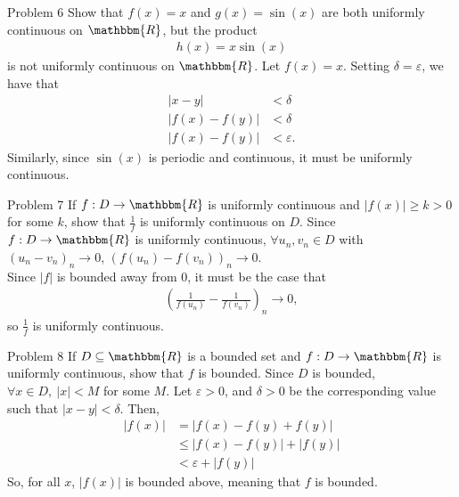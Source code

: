 \documentclass[10pt]{extarticle}
\newcommand{\R}{\mathbbm{R}}
\begin{document}
  \begin{problem}{Problem 6}
    Show that $f(x) = x$ and $g(x) = \sin(x)$ are both uniformly continuous on $\R$, but the product
    \begin{align*}
      h(x) = x\sin(x)
    \end{align*}
    is not uniformly continuous on $\R$.
    \tcblower
    Let $f(x) = x$. Setting $\delta = \varepsilon$, we have that
    \begin{align*}
      |x-y| &< \delta\\
      |f(x) - f(y)| &< \delta\\
      |f(x) - f(y)| &< \varepsilon.
    \end{align*}
    Similarly, since $\sin(x)$ is periodic and continuous, it must be uniformly continuous.
  \end{problem}
  \begin{problem}{Problem 7}
    If $f: D\rightarrow \R$ is uniformly continuous and $|f(x)| \geq k > 0$ for some $k$, show that $\frac{1}{f}$ is uniformly continuous on $D$.
    \tcblower
    Since $f: D\rightarrow\R$ is uniformly continuous, $\forall u_n,v_n\in D$ with $\left(u_n - v_n\right)_n\rightarrow 0$, $\left(f(u_n)-f(v_n)\right)_n \rightarrow 0$.\\

    Since $|f|$ is bounded away from $0$, it must be the case that
    \begin{align*}
      \left(\frac{1}{f(u_n)} - \frac{1}{f(v_n)}\right)_n \rightarrow 0,
    \end{align*}
    so $\frac{1}{f}$ is uniformly continuous.
  \end{problem}
  \begin{problem}{Problem 8}
    If $D\subseteq \R$ is a bounded set and $f: D\rightarrow \R$ is uniformly continuous, show that $f$ is bounded.
    \tcblower
    Since $D$ is bounded, $\forall x\in D,~|x| < M$ for some $M$. Let $\varepsilon > 0$, and $\delta > 0$ be the corresponding value such that $|x-y| < \delta$. Then,
    \begin{align*}
      |f(x)| &= |f(x) - f(y) + f(y)|\\
             &\leq |f(x) - f(y)| + |f(y)|\\
             &< \varepsilon + |f(y)|
    \end{align*}
    So, for all $x$, $|f(x)|$ is bounded above, meaning that $f$ is bounded.
  \end{problem}
\end{document}
